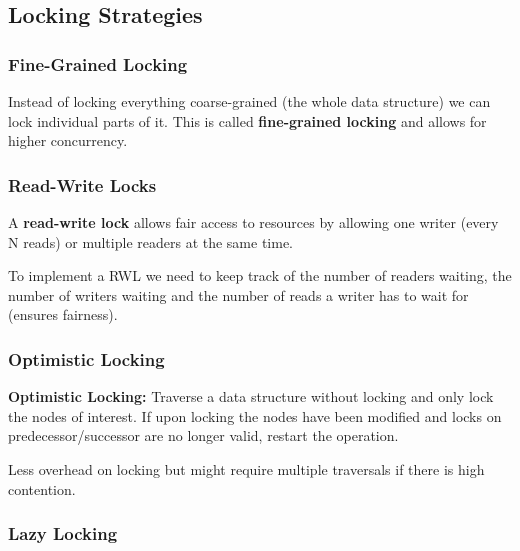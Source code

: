\subsection{Locking Strategies}

\subsubsection{Fine-Grained Locking}

\begin{remark}
Instead of locking everything coarse-grained (the whole data structure) we can lock individual parts of it. This is called \textbf{fine-grained locking} and allows for higher concurrency.
\end{remark}

\subsubsection{Read-Write Locks}

\begin{definition}
A \textbf{read-write lock} allows fair access to resources by allowing one writer (every N reads) or multiple readers at the same time.
\end{definition}

\begin{remark}
To implement a RWL we need to keep track of the number of readers waiting, the number of writers waiting and the number of reads a writer has to wait for (ensures fairness).
\end{remark}

\subsubsection{Optimistic Locking}

\begin{definition}
\textbf{Optimistic Locking:} Traverse a data structure without locking and only lock the nodes of interest. If upon locking the nodes have been modified and locks on predecessor/successor are no longer valid, restart the operation.
\end{definition}

\begin{remark}
Less overhead on locking but might require multiple traversals if there is high contention.
\end{remark}

\subsubsection{Lazy Locking}

